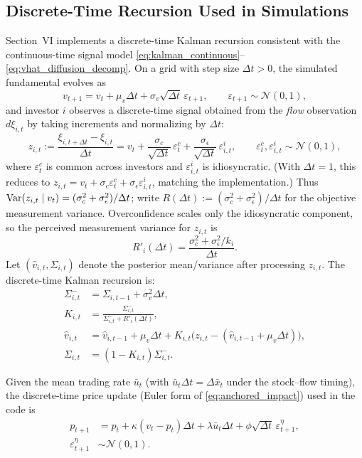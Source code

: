 \subsection{Discrete-Time Recursion Used in Simulations}

Section~VI implements a discrete-time Kalman recursion consistent with the continuous-time signal model \eqref{eq:kalman_continuous}--\eqref{eq:vhat_diffusion_decomp}. On a grid with step size $\Delta t>0$, the simulated fundamental evolves as
\[
v_{t+1}=v_t+\mu_v\Delta t+\sigma_v\sqrt{\Delta t}\,\varepsilon_{t+1},\qquad \varepsilon_{t+1}\sim\mathcal N(0,1),
\]
 and investor $i$ observes a discrete-time signal obtained from the \emph{flow} observation $d\xi_{i,t}$ by taking increments and normalizing by $\Delta t$:
 \[
 z_{i,t}:=\frac{\xi_{i,t+\Delta t}-\xi_{i,t}}{\Delta t}
 =v_t+\frac{\sigma_c}{\sqrt{\Delta t}}\,\varepsilon^c_t+\frac{\sigma_\epsilon}{\sqrt{\Delta t}}\,\varepsilon^i_{i,t},
 \qquad \varepsilon^c_t,\varepsilon^i_{i,t}\sim\mathcal N(0,1),
 \]
 where $\varepsilon^c_t$ is common across investors and $\varepsilon^i_{i,t}$ is idiosyncratic. (With $\Delta t=1$, this reduces to $z_{i,t}=v_t+\sigma_c\varepsilon^c_t+\sigma_\epsilon\varepsilon^i_{i,t}$, matching the implementation.)
Thus $\text{Var}(z_{i,t}\mid v_t)=(\sigma_c^2+\sigma_\epsilon^2)/\Delta t$; write $R(\Delta t):=(\sigma_c^2+\sigma_\epsilon^2)/\Delta t$ for the objective measurement variance.
Overconfidence scales only the idiosyncratic component, so the perceived measurement variance for $z_{i,t}$ is
 \[
 R'_i(\Delta t)=\frac{\sigma_c^2+\sigma_\epsilon^2/k_i}{\Delta t}.
 \]
 Let $(\hat v_{i,t},\Sigma_{i,t})$ denote the posterior mean/variance after processing $z_{i,t}$. The discrete-time Kalman recursion is:
  \begin{align*}
   \Sigma^-_{i,t} &= \Sigma_{i,t-1}+\sigma_v^2\Delta t,\\
  K_{i,t} &= \frac{\Sigma^-_{i,t}}{\Sigma^-_{i,t}+R'_i(\Delta t)},\\
   \hat v_{i,t} &= \hat v_{i,t-1}+\mu_v\Delta t+K_{i,t}\bigl(z_{i,t}-(\hat v_{i,t-1}+\mu_v\Delta t)\bigr),\\
   \Sigma_{i,t} &= (1-K_{i,t})\Sigma^-_{i,t}.
  \end{align*}
 
 Given the mean trading rate $\bar u_t$ (with $\bar u_t\Delta t=\Delta\bar x_t$ under the stock--flow timing), the discrete-time price update (Euler form of \eqref{eq:anchored_impact}) used in the code is
 \[
\begin{aligned}
 p_{t+1}
 &= p_t+\kappa(v_t-p_t)\Delta t+\lambda \bar u_t\Delta t + \phi \sqrt{\Delta t}\,\varepsilon^\eta_{t+1},\\
 \varepsilon^\eta_{t+1}&\sim\mathcal N(0,1).
\end{aligned}
 \]

